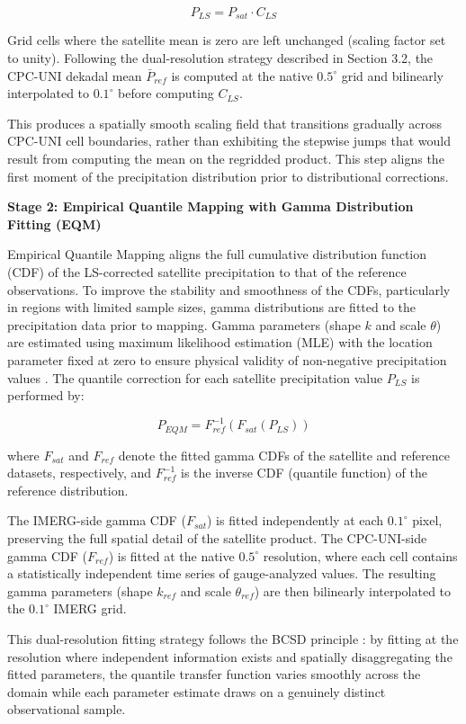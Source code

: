 \documentclass[
]{article}
\begin{document}
\[P_{LS} = P_{sat} \cdot C_{LS}\]

Grid cells where the satellite mean is zero are left unchanged (scaling
factor set to unity). Following the dual-resolution strategy described
in Section 3.2, the CPC-UNI dekadal mean \(\bar{P}_{ref}\) is computed
at the native \(0.5^{\circ}\) grid and bilinearly interpolated to
\(0.1^{\circ}\) before computing \(C_{LS}\).

This produces a spatially smooth scaling field that transitions
gradually across CPC-UNI cell boundaries, rather than exhibiting the
stepwise jumps that would result from computing the mean on the
regridded product. This step aligns the first moment of the
precipitation distribution prior to distributional corrections.

\textbf{Stage 2: Empirical Quantile Mapping with Gamma Distribution
Fitting (EQM)}

Empirical Quantile Mapping aligns the full cumulative distribution
function (CDF) of the LS-corrected satellite precipitation to that of
the reference observations. To improve the stability and smoothness of
the CDFs, particularly in regions with limited sample sizes, gamma
distributions are fitted to the precipitation data prior to mapping.
Gamma parameters (shape \(k\) and scale \(\theta\)) are estimated using
maximum likelihood estimation (MLE) with the location parameter fixed at
zero to ensure physical validity of non-negative precipitation values
\cite{ref15}. The quantile correction for each satellite precipitation value
\(P_{LS}\) is performed by:

\[P_{EQM} = F_{ref}^{-1}\left( F_{sat}\left( P_{LS} \right) \right)\]

where \(F_{sat}\) and \(F_{ref}\) denote the fitted gamma CDFs of the
satellite and reference datasets, respectively, and \(F_{ref}^{-1}\) is
the inverse CDF (quantile function) of the reference distribution.

The IMERG-side gamma CDF (\(F_{sat}\)) is fitted independently at each
\(0.1^{\circ}\) pixel, preserving the full spatial detail of the
satellite product. The CPC-UNI-side gamma CDF (\(F_{ref}\)) is fitted at
the native \(0.5^{\circ}\) resolution, where each cell contains a
statistically independent time series of gauge-analyzed values. The
resulting gamma parameters (shape \(k_{ref}\) and scale
\(\theta_{ref}\)) are then bilinearly interpolated to the
\(0.1^{\circ}\) IMERG grid.

This dual-resolution fitting strategy follows the BCSD principle
\cite{ref23}: by fitting at the resolution where independent information
exists and spatially disaggregating the fitted parameters, the quantile
transfer function varies smoothly across the domain while each parameter
estimate draws on a genuinely distinct observational sample.
\end{document}
